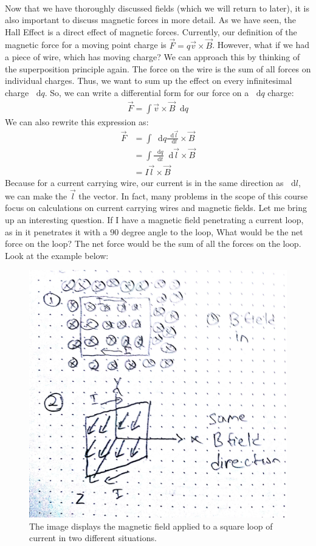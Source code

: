 \documentclass{article}
\newcommand*\dif{\mathop{}\!\mathrm{d}}
\begin{document}
\\
Now that we have thoroughly discussed fields (which we will return to later), it is also important to discuss magnetic forces in more detail. As we have seen, the Hall Effect is a direct effect of magnetic forces. Currently, our definition of the magnetic force for a moving point charge is $\vec{F} = q\vec{v}\times\vec{B}$. However, what if we had a piece of wire, which has moving charge? We can approach this by thinking of the superposition principle again. The force on the wire is the sum of all forces on individual charges. Thus, we want to sum up the effect on every infinitesimal charge $\dif q$. So, we can write a differential form for our force on a $\dif q$ charge: 
\begin{align*}
    \vec{F} = \int \vec{v}\times\vec{B}\dif q
\end{align*}
We can also rewrite this expression as:
\begin{align*}
    \vec{F} &= \int \dif q \frac{\dif \vec{l}}{\dif t} \times \vec{B}\\
    &= \int \frac{\dif q}{\dif t} \dif \vec{l} \times \vec{B}\\
    &= I\vec{l} \times \vec{B}
\end{align*}
Because for a current carrying wire, our current is in the same direction as $\dif l$, we can make the $\vec{l}$ the vector. In fact, many problems in the scope of this course focus on calculations on current carrying wires and magnetic fields. Let me bring up an interesting question. If I have a magnetic field penetrating a current loop, as in it penetrates it with a $90$ degree angle to the loop, What would be the net force on the loop? The net force would be the sum of all the forces on the loop. Look at the example below:
\pagebreak
\begin{figure}[ht]
\center
\includegraphics[width=.3\textwidth]{images/Week3pic4.jpg}
\caption{The image displays the magnetic field applied to a square loop of current in two different situations.}
\end{figure}
\end{document}
